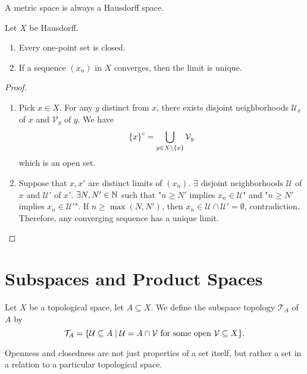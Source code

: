 A metric space is always a Hausdorff space.

\begin{lm}
    Let $X$ be Hausdorff.
    \begin{enumerate}[label={\alph*)}]
        \item Every one-point set is closed.
        \item If a sequence $(x_n)$ in $X$ converges, then the limit is unique.
    \end{enumerate}
    \begin{proof}
        \begin{enumerate}[label={\alph*)}]
            \item Pick $x\in X$. For any $y$ distinct from $x$, there exists disjoint neighborhoods $\mathcal U_x$ of $x$ and $\mathcal V_y$ of $y$. We have
            \[
            {\left\{{x}\right\}}^c = \bigcup_{y\in X\setminus {\left\{{x}\right\}}} \mathcal V_y
            \]
            which is an open set.

            \item 
            Suppose that $x, x'$ are distinct limits of $(x_n)$. $\exists$ disjoint neighborhoods $\mathcal U$ of $x$ and $\mathcal U'$ of $x'$. $\exists N, N'\in {\mathbb N}$ such that "$n\geq N'$ implies $x_n\in \mathcal U$" and "$n\geq N'$ implies $x_n \in \mathcal U'$". If $n\geq \max(N, N')$, then $x_n \in \mathcal U \cap \mathcal U' = \emptyset$, contradiction. Therefore, any converging sequence has a unique limit. 
        \end{enumerate}
    \end{proof}
\end{lm}

\section{Subspaces and Product Spaces}

\begin{df}
    Let $X$ be a topological space, let $A\subseteq X$. We define the subspace topology $\mathcal T_A$ of $A$ by
    \[
    \mathcal T_A = {\left\{{\mathcal U\subseteq A\mid \mathcal U = A\cap \mathcal V \text{ for some open }\mathcal V\subseteq X}\right\}}.
    \]
\end{df}

\begin{rmk}
    Openness and closedness are not just properties of a set itself, but rather a set in a relation to a particular topological space.
\end{rmk}

